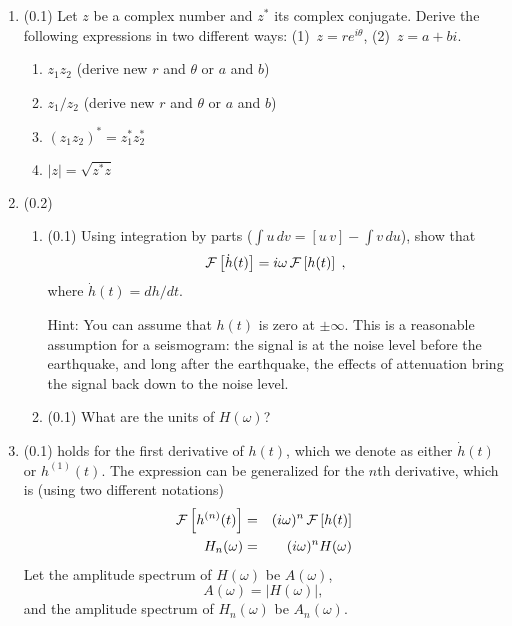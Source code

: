 \documentclass[11pt,titlepage,fleqn]{article}
\newcommand{\fft}{h}
\newcommand{\ffw}{H}
\begin{document}
\begin{enumerate}

\item (0.1) Let $z$ be a complex number and $z^*$ its complex conjugate. Derive the following expressions in two different ways: (1)~$z = r e^{i\theta}$, (2)~$z = a+bi$.
%
\begin{enumerate}
\item $z_1 z_2$ (derive new $r$ and $\theta$ or $a$ and $b$)
\item $z_1 / z_2$ (derive new $r$ and $\theta$ or $a$ and $b$)
\item $(z_1 z_2)^* = z_1^* z_2^*$
\item $|z| = \sqrt{z^* z}$
\end{enumerate}


\item (0.2)

\begin{enumerate}
\item (0.1) Using integration by parts ($\int u\,dv = [u\,v] - \int v\,du$), show that 
%
\begin{eqnarray}
\cF \left[ \dot{\fft}(t) \right] = i\omega \, \cF \left[ \fft(t) \right]
\label{fftder1}
\;,
\end{eqnarray}
%
where $\dot{\fft}(t) = d\fft/dt$.

Hint: You can assume that $h(t)$ is zero at $\pm\infty$. This is a reasonable assumption for a seismogram: the signal is at the noise level before the earthquake, and long after the earthquake, the effects of attenuation bring the signal back down to the noise level.

\item (0.1) What are the units of $\ffw(\omega)$?
\end{enumerate}


\item (0.1)  holds for the first derivative of $\fft(t)$, which we denote as either $\dot{\fft}(t)$ or $\fft^{(1)}(t)$. The expression can be generalized for the $n$th derivative, which is (using two different notations)
%
\begin{eqnarray}
\cF \left[ \fft^{(n)}(t) \right] &=& (i\omega)^n \, \cF \left[ \fft(t) \right]
\\
\ffw_n(\omega) &=& (i\omega)^n \ffw(\omega)
\label{fftnder}
\end{eqnarray}
%
Let the amplitude spectrum of $\ffw(\omega)$ be $A(\omega)$,
%
\begin{equation}
A(\omega) = |\ffw(\omega)|,
\end{equation}
%
and the amplitude spectrum of $\ffw_n(\omega)$ be $A_n(\omega)$.


\end{enumerate}
\end{document}
